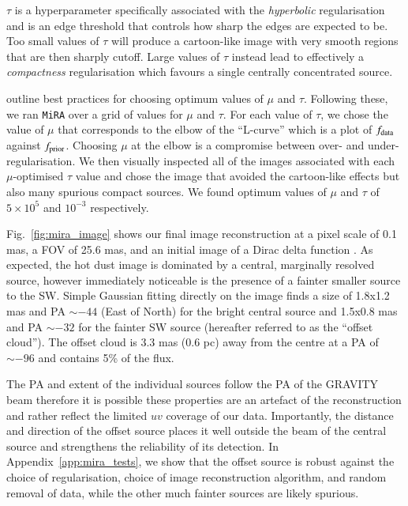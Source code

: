 \documentclass[longauth,]{aa}
\begin{document}
$\tau$ is a hyperparameter specifically associated with the \textit{hyperbolic} regularisation and is an edge threshold that controls how sharp the edges are expected to be. Too small values of $\tau$ will produce a cartoon-like image with very smooth regions that are then sharply cutoff. Large values of $\tau$ instead lead to effectively a \textit{compactness} regularisation which favours a single centrally concentrated source. 

\citet{Thiebaut:2017aa} outline best practices for choosing optimum values of $\mu$ and $\tau$. Following these, we ran \texttt{MiRA} over a grid of values for $\mu$ and $\tau$. For each value of $\tau$, we chose the value of $\mu$ that corresponds to the elbow of the ``L-curve'' which is a plot of $f_{\rm data}$ against $f_{\rm prior}$. Choosing $\mu$ at the elbow is a compromise between over- and under-regularisation. We then visually inspected all of the images associated with each $\mu$-optimised $\tau$ value and chose the image that avoided the cartoon-like effects but also many spurious compact sources. We found optimum values of $\mu$ and $\tau$ of $5\times10
^5$ and $10^{-3}$ respectively. 

Fig.~\ref{fig:mira_image} shows our final image reconstruction at a pixel scale of 0.1 mas, a FOV of 25.6 mas, and an initial image of a Dirac delta function . As expected, the hot dust image is dominated by a central, marginally resolved source, however immediately noticeable is the presence of a fainter smaller source to the SW. Simple Gaussian fitting directly on the image finds a size of 1.8x1.2 mas and PA $\sim-44$\degree{} (East of North) for the bright central source and 1.5x0.8 mas and PA $\sim-32$\degree{} for the fainter SW source (hereafter referred to as the ``offset cloud''). The offset cloud is 3.3 mas (0.6 pc)  away from the centre at a PA of $\sim-96$\degree{} and contains 5\% of the flux. 

The PA and extent of the individual sources follow the PA of the GRAVITY beam therefore it is possible these properties are an artefact of the reconstruction and rather reflect the limited $uv$ coverage of our data. Importantly, the distance and direction of the offset source places it well outside the beam of the central source and strengthens the reliability of its detection. In Appendix~\ref{app:mira_tests}, we show that the offset source is robust against the choice of regularisation, choice of image reconstruction algorithm, and random removal of data, while the other much fainter sources are likely spurious. 
\end{document}
